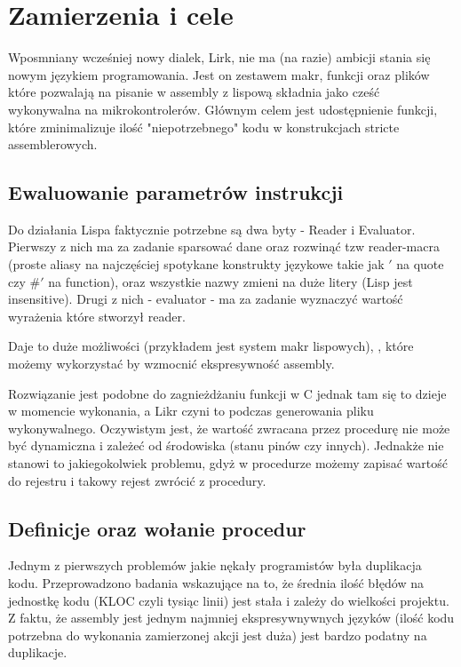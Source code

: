 \documentclass[11pt]{article}
\begin{document}
\section{Zamierzenia i cele}
Wposmniany wcześniej nowy dialek, Lirk,  nie ma (na razie) ambicji stania się nowym językiem programowania. Jest on zestawem makr, funkcji oraz plików które pozwalają na pisanie w assembly z lispową składnia jako cześć wykonywalna na mikrokontrolerów. Głównym celem jest udostępnienie funkcji, które zminimalizuje ilość "niepotrzebnego" kodu w konstrukcjach stricte assemblerowych.

\subsection{Ewaluowanie parametrów instrukcji}

Do działania Lispa faktycznie potrzebne są dwa byty - Reader i Evaluator. Pierwszy z nich ma za zadanie sparsować dane oraz rozwinąć tzw reader-macra (proste aliasy na najczęściej spotykane konstrukty językowe takie jak $'$ na quote czy $\#'$ na function), oraz wszystkie nazwy zmieni na duże litery (Lisp jest insensitive). Drugi z nich - evaluator - ma za zadanie wyznaczyć wartość wyrażenia które stworzył reader. 

Daje to duże możliwości (przykładem jest system makr lispowych), , które możemy wykorzystać by wzmocnić ekspresywność assembly. 



Rozwiązanie jest podobne do zagnieżdżaniu funkcji w C jednak tam się to dzieje w momencie wykonania, a Likr czyni to podczas generowania pliku wykonywalnego.
Oczywistym jest, że wartość zwracana przez procedurę nie może być dynamiczna i zależeć od środowiska (stanu pinów czy innych).
Jednakże nie stanowi to jakiegokolwiek problemu, gdyż w procedurze możemy zapisać wartość do rejestru i takowy rejest zwrócić z procedury.

\subsection{Definicje oraz wołanie procedur}

Jednym z pierwszych problemów jakie nękały programistów była duplikacja kodu. Przeprowadzono badania wskazujące na to, że średnia ilość błędów na jednostkę kodu (KLOC czyli tysiąc linii) jest stała i zależy do wielkości projektu. Z faktu, że assembly jest jednym najmniej ekspresywnywnych języków (ilość kodu potrzebna do wykonania zamierzonej akcji jest duża) jest bardzo podatny na duplikacje.
\end{document}
